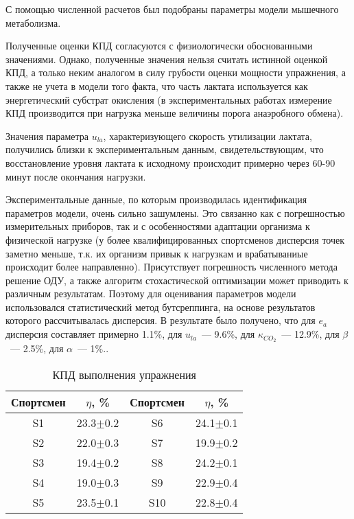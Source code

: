 С помощью численной расчетов был подобраны параметры модели мышечного метаболизма.

Полученные оценки КПД согласуются с физиологически обоснованными значениями. Однако, полученные значения нельзя считать истинной оценкой КПД, а только неким аналогом в силу грубости оценки мощности упражнения, а также не учета в модели того факта, что часть лактата используется как энергетический субстрат окисления (в экспериментальных работах измерение КПД производится при нагрузка меньше величины порога анаэробного обмена).

Значения параметра \(u_{la}\), характеризующего скорость утилизации лактата, получились близки к экспериментальным данным, свидетельствующим, что восстановление уровня лактата к исходному происходит примерно через 60-90 минут после окончания нагрузки. 

Экспериментальные данные, по которым производилась идентификация параметров модели, очень сильно зашумлены. Это связанно как с погрешностью измерительных приборов, так и с особенностями адаптации организма к физической нагрузке (у более квалифицированных спортсменов дисперсия точек заметно меньше, т.к. их организм привык к нагрузкам и врабатываниые происходит более направленно). Присутствует погрешность численного метода решение ОДУ, а также алгоритм стохастической оптимизации может приводить к различным результатам. Поэтому для оценивания параметров модели использовался статистический метод бутсреппинга, на основе результатов которого рассчитывалась дисперсия.     
В результате было получено, что для \(e_{a}\) дисперсия составляет примерно 1.1\%, для \(u_{la}\)~--- 9.6\%, для \(\kappa_{CO_{2}}\)~--- 12.9\%, для \(\beta\)~--- 2.5\%, для \(\alpha\)~--- 1\%..


\begin{table}[!ht]
\centering
\caption{КПД выполнения упражнения}
\medskip
\label{tabular:tab5}
\begin{tabular}{|c|c|c|c|}
\hline
Спортсмен &  \(\eta\), \% & Спортсмен &  \(\eta\), \% \\
\hline
S1 & 23.3$\pm$0.2 & S6 & 24.1$\pm$0.1\\
\hline
S2 & 22.0$\pm$0.3 & S7 & 19.9$\pm$0.2\\
\hline
S3 & 19.4$\pm$0.2 & S8 & 24.2$\pm$0.1\\
\hline
S4 & 19.0$\pm$0.3 & S9 & 22.9$\pm$0.4\\
\hline
S5 & 23.5$\pm$0.1 & S10 & 22.8$\pm$0.4\\
\hline
\end{tabular}
\end{table}

